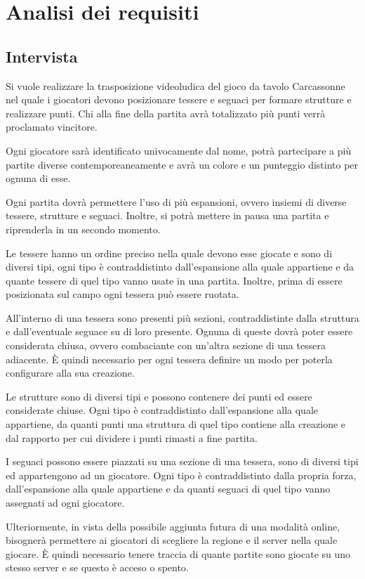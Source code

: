 \section{Analisi dei requisiti}
\subsection{Intervista}
Si vuole realizzare la trasposizione videoludica del gioco da tavolo Carcassonne \cite{Carcassonne} nel quale i giocatori devono posizionare tessere e seguaci per formare strutture e realizzare punti. Chi alla fine della partita avrà totalizzato più punti verrà proclamato vincitore.
\medskip

Ogni giocatore sarà identificato univocamente dal nome, potrà partecipare a più partite diverse contemporeaneamente e avrà un colore e un punteggio distinto per ognuna di esse.
\medskip

Ogni partita dovrà permettere l'uso di più espansioni, ovvero insiemi di diverse tessere, strutture e seguaci. Inoltre, si potrà mettere in pausa una partita e riprenderla in un secondo momento.
\medskip

Le tessere hanno un ordine preciso nella quale devono esse giocate e sono di diversi tipi, ogni tipo è contraddistinto dall'espansione alla quale appartiene e da quante tessere di quel tipo vanno usate in una partita. Inoltre, prima di essere posizionata sul campo ogni tessera può essere ruotata.
\medskip

All'interno di una tessera sono presenti più sezioni, contraddistinte dalla struttura e dall'eventuale seguace su di loro presente. Ognuna di queste dovrà poter essere considerata chiusa, ovvero combaciante con un'altra sezione di una tessera adiacente. È quindi necessario per ogni tessera definire un modo per poterla configurare alla sua creazione.
\medskip

Le strutture sono di diversi tipi e possono contenere dei punti ed essere considerate chiuse. Ogni tipo è contraddistinto dall'espansione alla quale appartiene, da quanti punti una struttura di quel tipo contiene alla creazione e dal rapporto per cui dividere i punti rimasti a fine partita.
\medskip

I seguaci possono essere piazzati su una sezione di una tessera, sono di diversi tipi ed appartengono ad un giocatore. Ogni tipo è contraddistinto dalla propria forza, dall'espansione alla quale appartiene e da quanti seguaci di quel tipo vanno assegnati ad ogni giocatore.
\medskip

Ulteriormente, in vista della possibile aggiunta futura di una modalità online, bisognerà permettere ai giocatori di scegliere la regione e il server nella quale giocare. È quindi necessario tenere traccia di quante partite sono giocate su uno stesso server e se questo è acceso o spento.

